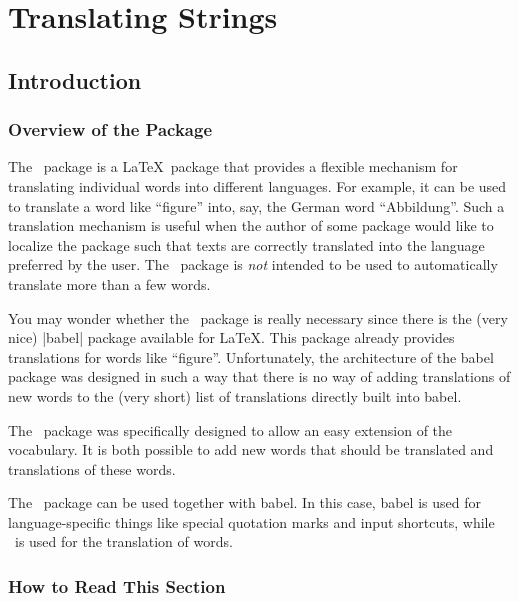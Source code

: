 %
%
%

\section{Translating Strings}

\subsection{Introduction}

\subsubsection{Overview of the Package}

The \translatorname\ package is a \LaTeX\ package that provides a flexible mechanism for translating individual words into different languages. For example, it can be used to translate a word like ``figure'' into, say, the German word ``Abbildung''. Such a translation mechanism is useful when the author of some package would like to localize the package such that texts are correctly translated into the language preferred by the user. The \translatorname\ package is \emph{not} intended to be used to automatically translate more than a few words.

You may wonder whether the \translatorname\ package is really necessary since there is the (very nice) |babel| package available for \LaTeX. This package already provides translations for words like ``figure''. Unfortunately, the architecture of the babel package was designed in such a way that there is no way of adding translations of new words to the (very short) list of translations directly built into babel.

The \translatorname\ package was specifically designed to allow an easy extension of the vocabulary. It is both possible to add new words that should be translated and translations of these words.

The \translatorname\ package can be used together with babel. In this case, babel is used for language-specific things like special quotation marks and input shortcuts, while \translatorname\ is used for the translation of words.

\subsubsection{How to Read This Section}

